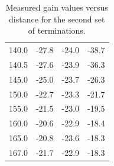 \begin{table}[ht!]
\begin{tabular}{|c||c|c|c|}
		140.0 & -27.8 & -24.0 & -38.7 \\
		140.5 & -27.6 & -23.9 & -36.3 \\
		145.0 & -25.0 & -23.7 & -26.3 \\
		150.0 & -22.7 & -23.3 & -21.7 \\
		155.0 & -21.5 & -23.0 & -19.5 \\
		160.0 & -20.6 & -22.9 & -18.4 \\
		165.0 & -20.8 & -23.6 & -18.3 \\
		167.0 & -21.7 & -22.9 & -18.3 \\
		\hline
	\end{tabular}
	\caption{\centering Measured gain values versus distance for the second set of terminations.}
	\label{tab:power_plots_2}
\end{table}